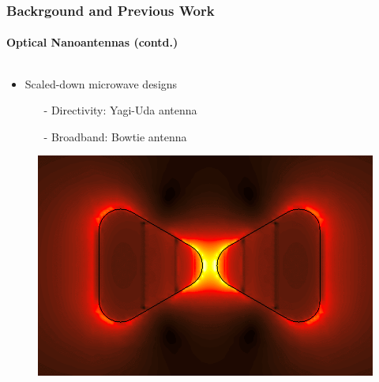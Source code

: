\documentclass[mathserif,18pt,xcolor=table]{beamer}
\begin{document}
\begin{frame}
  \frametitle{Backrgound and Previous Work}
  \framesubtitle{Optical Nanoantennas (contd.)}

  \begin{columns} %
    \begin{column}{.45\textwidth}
      \begin{minipage}[T][.1\textheight][c]{\linewidth}
        \begin{itemize}
          \item Scaled-down microwave designs
          \begin{itemize}
            \item[-] Directivity: Yagi-Uda antenna
            \item[-] Broadband: Bowtie antenna
          \end{itemize}
        \end{itemize}
        \begin{figure}
          \includegraphics[scale=.03]{bowtie_field_map.png}
        \end{figure}
      \end{minipage}
    \end{column}

\end{columns}
\end{frame}
\end{document}
